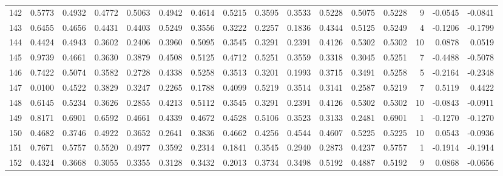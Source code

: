 \begin{tabular}{lrrrrrrrrrrrrrrr}
142 &      0.5773 &  0.4932 &  0.4772 &  0.5063 &  0.4942 &  0.4614 &  0.5215 &  0.3595 &  0.3533 &  0.5228 &   0.5075 &     0.5228 &      9 &                   -0.0545 &                    -0.0841 \\
143 &      0.6455 &  0.4656 &  0.4431 &  0.4403 &  0.5249 &  0.3556 &  0.3222 &  0.2257 &  0.1836 &  0.4344 &   0.5125 &     0.5249 &      4 &                   -0.1206 &                    -0.1799 \\
144 &      0.4424 &  0.4943 &  0.3602 &  0.2406 &  0.3960 &  0.5095 &  0.3545 &  0.3291 &  0.2391 &  0.4126 &   0.5302 &     0.5302 &     10 &                    0.0878 &                     0.0519 \\
145 &      0.9739 &  0.4661 &  0.3630 &  0.3879 &  0.4508 &  0.5125 &  0.4712 &  0.5251 &  0.3559 &  0.3318 &   0.3045 &     0.5251 &      7 &                   -0.4488 &                    -0.5078 \\
146 &      0.7422 &  0.5074 &  0.3582 &  0.2728 &  0.4338 &  0.5258 &  0.3513 &  0.3201 &  0.1993 &  0.3715 &   0.3491 &     0.5258 &      5 &                   -0.2164 &                    -0.2348 \\
147 &      0.0100 &  0.4522 &  0.3829 &  0.3247 &  0.2265 &  0.1788 &  0.4099 &  0.5219 &  0.3514 &  0.3141 &   0.2587 &     0.5219 &      7 &                    0.5119 &                     0.4422 \\
148 &      0.6145 &  0.5234 &  0.3626 &  0.2855 &  0.4213 &  0.5112 &  0.3545 &  0.3291 &  0.2391 &  0.4126 &   0.5302 &     0.5302 &     10 &                   -0.0843 &                    -0.0911 \\
149 &      0.8171 &  0.6901 &  0.6592 &  0.4661 &  0.4339 &  0.4672 &  0.4528 &  0.5106 &  0.3523 &  0.3133 &   0.2481 &     0.6901 &      1 &                   -0.1270 &                    -0.1270 \\
150 &      0.4682 &  0.3746 &  0.4922 &  0.3652 &  0.2641 &  0.3836 &  0.4662 &  0.4256 &  0.4544 &  0.4607 &   0.5225 &     0.5225 &     10 &                    0.0543 &                    -0.0936 \\
151 &      0.7671 &  0.5757 &  0.5520 &  0.4977 &  0.3592 &  0.2314 &  0.1841 &  0.3545 &  0.2940 &  0.2873 &   0.4237 &     0.5757 &      1 &                   -0.1914 &                    -0.1914 \\
152 &      0.4324 &  0.3668 &  0.3055 &  0.3355 &  0.3128 &  0.3432 &  0.2013 &  0.3734 &  0.3498 &  0.5192 &   0.4887 &     0.5192 &      9 &                    0.0868 &                    -0.0656 \\

\end{tabular}
